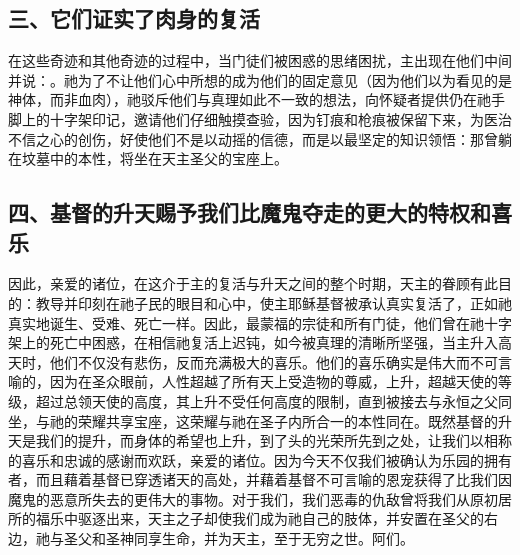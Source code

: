 
\subsection{三、它们证实了肉身的复活}

在这些奇迹和其他奇迹的过程中，当门徒们被困惑的思绪困扰，主出现在他们中间并说：。祂为了不让他们心中所想的成为他们的固定意见（因为他们以为看见的是神体，而非血肉），祂驳斥他们与真理如此不一致的想法，向怀疑者提供仍在祂手脚上的十字架印记，邀请他们仔细触摸查验，因为钉痕和枪痕被保留下来，为医治不信之心的创伤，好使他们不是以动摇的信德，而是以最坚定的知识领悟：那曾躺在坟墓中的本性，将坐在天主圣父的宝座上。\par


\subsection{四、基督的升天赐予我们比魔鬼夺走的更大的特权和喜乐}

因此，亲爱的诸位，在这介于主的复活与升天之间的整个时期，天主的眷顾有此目的：教导并印刻在祂子民的眼目和心中，使主耶稣基督被承认真实复活了，正如祂真实地诞生、受难、死亡一样。因此，最蒙福的宗徒和所有门徒，他们曾在祂十字架上的死亡中困惑，在相信祂复活上迟钝，如今被真理的清晰所坚强，当主升入高天时，他们不仅没有悲伤，反而充满极大的喜乐。他们的喜乐确实是伟大而不可言喻的，因为在圣众眼前，人性超越了所有天上受造物的尊威，上升，超越天使的等级，超过总领天使的高度，其上升不受任何高度的限制，直到被接去与永恒之父同坐，与祂的荣耀共享宝座，这荣耀与祂在圣子内所合一的本性同在。既然基督的升天是我们的提升，而身体的希望也上升，到了头的光荣所先到之处，让我们以相称的喜乐和忠诚的感谢而欢跃，亲爱的诸位。因为今天不仅我们被确认为乐园的拥有者，而且藉着基督已穿透诸天的高处，并藉着基督不可言喻的恩宠获得了比我们因魔鬼的恶意所失去的更伟大的事物。对于我们，我们恶毒的仇敌曾将我们从原初居所的福乐中驱逐出来，天主之子却使我们成为祂自己的肢体，并安置在圣父的右边，祂与圣父和圣神同享生命，并为天主，至于无穷之世。阿们。\par


